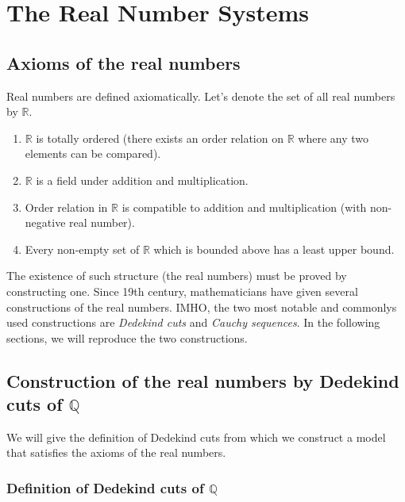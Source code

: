 \chapter{The Real Number Systems}

\section{Axioms of the real numbers}

Real numbers are defined axiomatically. Let's denote the set of all real numbers by $\mathbb{R}$.
\begin{enumerate}[label={(\roman*)}]
    \item $\mathbb{R}$ is totally ordered (there exists an order relation on $\mathbb{R}$ where any two elements can be compared).
    \item $\mathbb{R}$ is a field under addition and multiplication.
    \item Order relation in $\mathbb{R}$ is compatible to addition and multiplication (with non-negative real number).
    \item Every non-empty set of $\mathbb{R}$ which is bounded above has a least upper bound.
\end{enumerate}

The existence of such structure (the real numbers) must be proved by constructing one. Since 19th century, mathematicians have given several constructions of the real numbers. IMHO, the two most notable and commonlys used constructions are \textit{Dedekind cuts} and \textit{Cauchy sequences}. In the following sections, we will reproduce the two constructions.

\section{Construction of the real numbers by Dedekind cuts of $\mathbb{Q}$}

We will give the definition of Dedekind cuts from which we construct a model that satisfies the axioms of the real numbers.

\subsection{Definition of Dedekind cuts of $\mathbb{Q}$}

